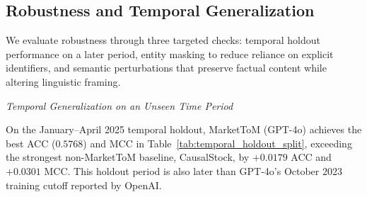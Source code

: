 \documentclass[a4paper,fleqn,doubleblind]{cas-sc}
\begin{document}
\subsection{Robustness and Temporal Generalization}
We evaluate robustness through three targeted checks: temporal holdout performance on a later period, entity masking to reduce reliance on explicit identifiers, and semantic perturbations that preserve factual content while altering linguistic framing.

\textit{Temporal Generalization on an Unseen Time Period}
\begin{table}[htbp]
\centering
\small
\renewcommand{\arraystretch}{0.8}
\caption{Performance Comparison on a Temporal Holdout Split}
\label{tab:temporal_holdout_split}
\end{table}

On the January--April 2025 temporal holdout, MarketToM (GPT-4o) achieves the best ACC ($0.5768$) and MCC in Table~\ref{tab:temporal_holdout_split}, exceeding the strongest non-MarketToM baseline, CausalStock, by $+0.0179$ ACC and $+0.0301$ MCC. This holdout period is also later than GPT-4o's October 2023 training cutoff reported by OpenAI.
\end{document}
